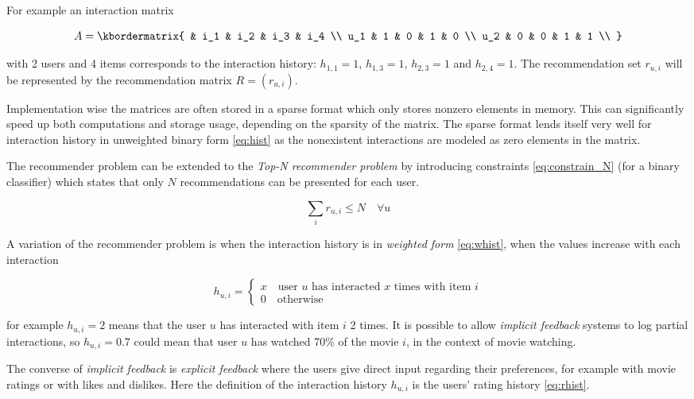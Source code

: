 For example an interaction matrix

\[
  A = \kbordermatrix{
    &   i_1 & i_2 & i_3 & i_4 \\
    u_1 & 1 & 0 & 1 & 0 \\
    u_2 & 0 & 0 & 1 & 1 \\
  }
\]

with 2 users and 4 items corresponds to the interaction history: $h_{1, 1} = 1$, $h_{1, 3} = 1$, $h_{2, 3} = 1$ and $h_{2, 4} = 1$.  The recommendation set $r_{u, i}$ will be represented by the recommendation matrix $R = (r_{u, i})$.

Implementation wise the matrices are often stored in a sparse format which only stores nonzero elements in memory. This can significantly speed up both computations and storage usage, depending on the sparsity of the matrix. The sparse format lends itself very well for interaction history in unweighted binary form \eqref{eq:hist} as the nonexistent interactions are modeled as zero elements in the matrix.

The recommender problem can be extended to the \textit{Top-N recommender problem} by introducing constraints \eqref{eq:constrain_N} (for a binary classifier) which states that only $N$ recommendations can be presented for each user.

\begin{equation}\label{eq:constrain_N}
    \sum_i r_{u, i} \leq N \quad \forall u
\end{equation}

A variation of the recommender problem is when the interaction history is in \textit{weighted form} \eqref{eq:whist}, when the values increase with each interaction

\begin{equation}\label{eq:whist}
    h_{u, i} = \begin{cases}
        x \quad \text{user $u$ has interacted $x$ times with item $i$} \\
        0 \quad \text{otherwise}
    \end{cases}
\end{equation}

for example $h_{u, i} = 2$ means that the user $u$ has interacted with item $i$ 2 times. It is possible to allow \textit{implicit feedback} systems to log partial interactions, so $h_{u, i} = 0.7$ could mean that user $u$ has watched 70\% of the movie $i$, in the context of movie watching. \citep{hu2008collaborative}

The converse of \textit{implicit feedback} is \textit{explicit feedback} where the users give direct input regarding their preferences, for example with movie ratings or with likes and dislikes.  Here the definition of the interaction history $h_{u, i}$ is the users' rating history \eqref{eq:rhist}.

